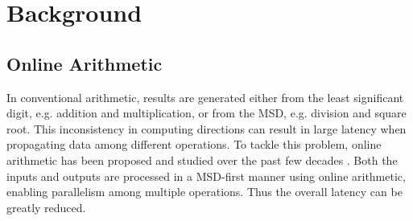 \documentclass{acm_proc_article-sp}
\begin{document}
\section{Background}
\subsection{Online Arithmetic}
In conventional arithmetic, results are generated either from the least significant digit, e.g. addition and multiplication, or from the MSD, e.g. division and square root. This inconsistency in computing directions can result in large latency when propagating data among different operations. To tackle this problem, online arithmetic has been proposed and studied over the past few decades \cite{Ercegovac_OnlineOverview,Ercegovac_OnlineMult}. Both the inputs and outputs are processed in a MSD-first manner using online arithmetic, enabling parallelism among multiple operations. Thus the overall latency can be greatly reduced.\vspace{-1ex}
\end{document}
